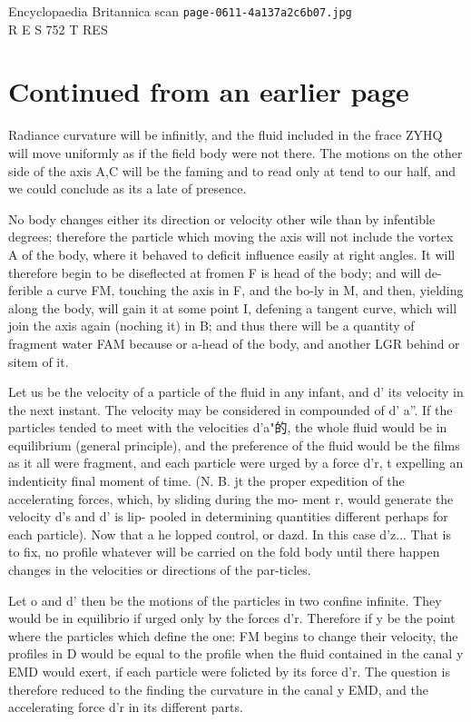 \documentclass{article}
\begin{document}
\begin{center}
{\Large Encyclopaedia Britannica scan \texttt{page-0611-4a137a2c6b07.jpg}}\\[0.5em]
R E S 752 T RES
\end{center}
\section*{Continued from an earlier page}
Radiance curvature will be infinitly, and the fluid included in the frace ZYHQ will move uniformly as if the field body were not there. The motions on the other side of the axis A,C will be the faming and to read only at tend to our half, and we could conclude as its a late of presence.

No body changes either its direction or velocity other wile than by infentible degrees; therefore the particle which moving the axis will not include the vortex A of the body, where it behaved to deficit influence easily at right angles. It will therefore begin to be diseflected at fromen F is head of the body; and will de-ferible a curve FM, touching the axis in F, and the bo-ly in M, and then, yielding along the body, will gain it at some point I, defening a tangent curve, which will join the axis again (noching it) in B; and thus there will be a quantity of fragment water FAM because or a-head of the body, and another LGR behind or sitem of it.

Let us be the velocity of a particle of the fluid in any infant, and d’ its velocity in the next instant. The velocity may be considered in compounded of d’ a”. If the particles tended to meet with the velocities d’a"的, the whole fluid would be in equilibrium (general principle), and the preference of the fluid would be the films as it all were fragment, and each particle were urged by a force d’r, t expelling an indenticity final moment of time. (N. B. jt the proper expedition of the accelerating forces, which, by sliding during the mo- ment r, would generate the velocity d’s and d’ is lip- pooled in determining quantities different perhaps for each particle). Now that a he lopped control, or dazd. In this case d’z... That is to fix, no profile whatever will be carried on the fold body until there happen changes in the velocities or directions of the par-ticles.

Let o and d’ then be the motions of the particles in two confine infinite. They would be in equilibrio if urged only by the forces d’r. Therefore if y be the point where the particles which define the one: FM begins to change their velocity, the profiles in D would be equal to the profile when the fluid contained in the canal y EMD would exert, if each particle were folicted by its force d’r. The question is therefore reduced to the finding the curvature in the canal y EMD, and the accelerating force d’r in its different parts.
\end{document}
